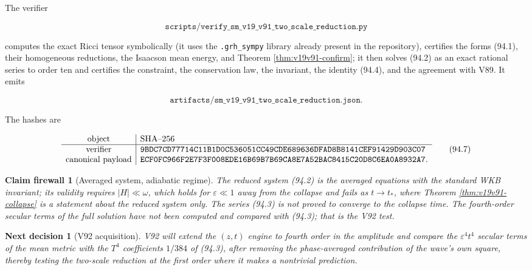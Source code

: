 \documentclass[11pt]{article}
\newtheorem{firewall}[theorem]{Claim firewall}
\newtheorem{decision}[theorem]{Next decision}
\theoremstyle{remark}
\begin{document}
The verifier

\[
 \texttt{scripts/verify\_sm\_v19\_v91\_two\_scale\_reduction.py}    \tag{94.5}
\]

computes the exact Ricci tensor symbolically (it uses the
\texttt{.grh\_sympy} library already present in the repository),
certifies the forms (94.1), their homogeneous reductions, the
Isaacson mean energy, and Theorem \ref{thm:v19v91-confirm}; it then
solves (94.2) as an exact rational series to order ten and certifies
the constraint, the conservation law, the invariant, the identity
(94.4), and the agreement with V89.  It emits

\[
 \texttt{artifacts/sm\_v19\_v91\_two\_scale\_reduction.json}.        \tag{94.6}
\]

The hashes are

\[
\begin{array}{c|l}
\hbox{object}&\hbox{SHA--256}\\ \hline
\hbox{verifier}&
\texttt{9BDC7CD77714C11B1D0C536051CC49CDE689636DFAD8B8141CEF91429D903C07}\\
\hbox{canonical payload}&
\texttt{ECF0FC966F2E7F3F008EDE16B69B7B69CA8E7A52BAC8415C20D8C6EA0A8932A7}.
\end{array}                                                     \tag{94.7}
\]

\begin{firewall}[Averaged system, adiabatic regime]
\label{fire:v19v91}
The reduced system (94.2) is the averaged equations with the standard
WKB invariant; its validity requires \(|H|\ll\omega\), which holds for
\(\varepsilon\ll1\) away from the collapse and fails as
\(t\to t_*\), where Theorem \ref{thm:v19v91-collapse} is a statement
about the reduced system only.  The series (94.3) is not proved to
converge to the collapse time.  The fourth-order secular terms of the
full solution have not been computed and compared with (94.3); that is
the V92 test.
\end{firewall}

\begin{decision}[V92 acquisition]
\label{dec:v19v91-next}
V92 will extend the \((z,t)\) engine to fourth order in the amplitude
and compare the \(\varepsilon^4t^4\) secular terms of the mean metric
with the \(T^4\) coefficients \(1/384\) of (94.3), after removing
the phase-averaged contribution of the wave's own square, thereby
testing the two-scale reduction at the first order where it makes a
nontrivial prediction.
\end{decision}
\end{document}
